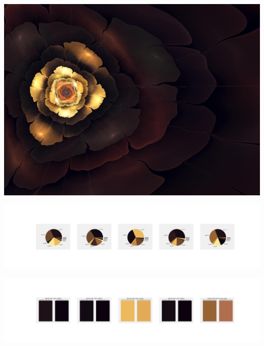 \documentclass[11pt]{article}
\begin{document}
\begin{landscape}
    \begin{center}
    \includegraphics[width=\textwidth]{./nbimg/file (201).jpg}
    \end{center}

    \begin{center}
    \includegraphics[width=250mm]{./nbimg/pie-114.jpg}
    \end{center}

    \begin{center}
    \includegraphics[width=250mm]{./nbimg/peak-114.jpg}
    \end{center}
    


\end{landscape}
\end{document}
